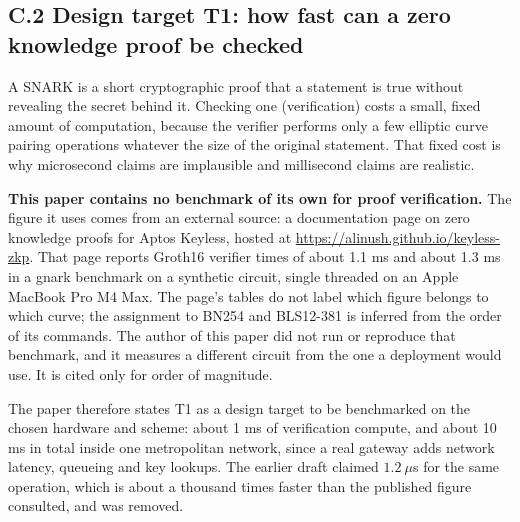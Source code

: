 \documentclass[11pt,a4paper]{article}
\theoremstyle{definition}
\theoremstyle{plain}
\theoremstyle{remark}
\begin{document}
\subsection*{C.2 Design target T1: how fast can a zero knowledge proof be checked}
A SNARK is a short cryptographic proof that a statement is true without revealing the secret behind it. Checking one (verification) costs a small, fixed amount of computation, because the verifier performs only a few elliptic curve pairing operations whatever the size of the original statement. That fixed cost is why microsecond claims are implausible and millisecond claims are realistic.

\textbf{This paper contains no benchmark of its own for proof verification.} The figure it uses comes from an external source: a documentation page on zero knowledge proofs for Aptos Keyless, hosted at \url{https://alinush.github.io/keyless-zkp}. That page reports Groth16 verifier times of about 1.1 ms and about 1.3 ms in a gnark benchmark on a synthetic circuit, single threaded on an Apple MacBook Pro M4 Max. The page's tables do not label which figure belongs to which curve; the assignment to BN254 and BLS12-381 is inferred from the order of its commands. The author of this paper did not run or reproduce that benchmark, and it measures a different circuit from the one a deployment would use. It is cited only for order of magnitude.

The paper therefore states T1 as a design target to be benchmarked on the chosen hardware and scheme: about 1 ms of verification compute, and about 10 ms in total inside one metropolitan network, since a real gateway adds network latency, queueing and key lookups. The earlier draft claimed $1.2\ \mu$s for the same operation, which is about a thousand times faster than the published figure consulted, and was removed.
\end{document}
